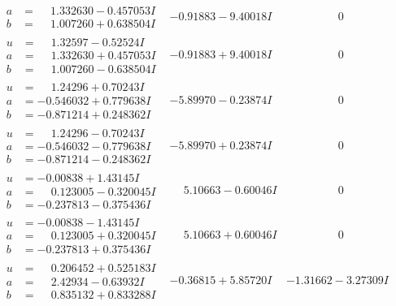 \documentclass[1p]{elsarticle_modified}
\theoremstyle{definition}
\begin{document}
$$\begin{array}{c|c|c}
\begin{aligned}
a &= \phantom{-}1.332630 - 0.457053 I \\
b &= \phantom{-}1.007260 + 0.638504 I\end{aligned}
 & -0.91883 - 9.40018 I & \phantom{-0.000000 } 0 \\ \hline\begin{aligned}
u &= \phantom{-}1.32597 - 0.52524 I \\
a &= \phantom{-}1.332630 + 0.457053 I \\
b &= \phantom{-}1.007260 - 0.638504 I\end{aligned}
 & -0.91883 + 9.40018 I & \phantom{-0.000000 } 0 \\ \hline\begin{aligned}
u &= \phantom{-}1.24296 + 0.70243 I \\
a &= -0.546032 + 0.779638 I \\
b &= -0.871214 + 0.248362 I\end{aligned}
 & -5.89970 - 0.23874 I & \phantom{-0.000000 } 0 \\ \hline\begin{aligned}
u &= \phantom{-}1.24296 - 0.70243 I \\
a &= -0.546032 - 0.779638 I \\
b &= -0.871214 - 0.248362 I\end{aligned}
 & -5.89970 + 0.23874 I & \phantom{-0.000000 } 0 \\ \hline\begin{aligned}
u &= -0.00838 + 1.43145 I \\
a &= \phantom{-}0.123005 - 0.320045 I \\
b &= -0.237813 - 0.375436 I\end{aligned}
 & \phantom{-}5.10663 - 0.60046 I & \phantom{-0.000000 } 0 \\ \hline\begin{aligned}
u &= -0.00838 - 1.43145 I \\
a &= \phantom{-}0.123005 + 0.320045 I \\
b &= -0.237813 + 0.375436 I\end{aligned}
 & \phantom{-}5.10663 + 0.60046 I & \phantom{-0.000000 } 0 \\ \hline\begin{aligned}
u &= \phantom{-}0.206452 + 0.525183 I \\
a &= \phantom{-}2.42934 - 0.63932 I \\
b &= \phantom{-}0.835132 + 0.833288 I\end{aligned}
 & -0.36815 + 5.85720 I & -1.31662 - 3.27309 I \\ \hline\begin{aligned}

\end{aligned}
\end{array}$$
\end{document}
